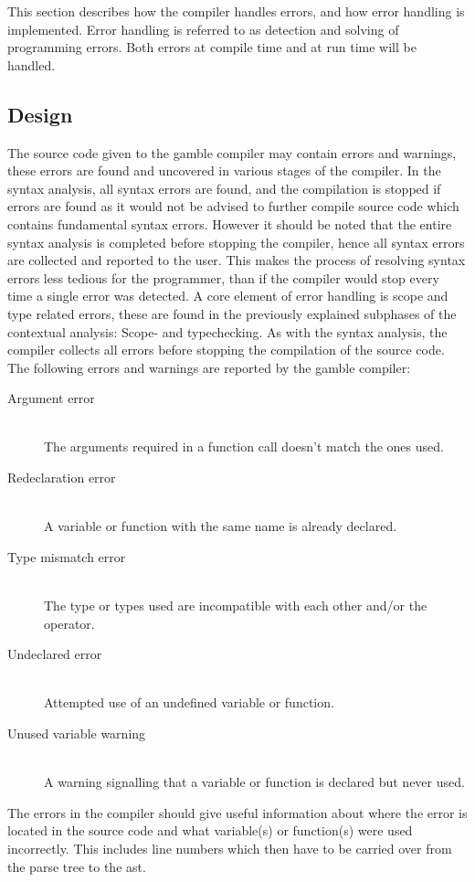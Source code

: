 This section describes how the compiler handles errors, and how error handling is implemented.
Error handling is referred to as detection and solving of programming errors.
Both errors at compile time and at run time will be handled.
\subsection*{Design}\label{subsec:DesignErrorHandling}
The source code given to the \gls{gamble} compiler may contain errors and warnings, these errors are found and uncovered in various stages of the compiler.   
In the syntax analysis, all syntax errors are found, and the compilation is stopped if errors are found as it would not be advised to further compile source code which contains fundamental syntax errors.
However it should be noted that the entire syntax analysis is completed before stopping the compiler, hence all syntax errors are collected and reported to the user.
This makes the process of resolving syntax errors less tedious for the programmer, than if the compiler would stop every time a single error was detected. 
A core element of error handling is scope and type related errors, these are found in the previously explained subphases of the contextual analysis: Scope- and typechecking.
As with the syntax analysis, the compiler collects all errors before stopping the compilation of the source code. 
The following errors and warnings are reported by the \gls{gamble} compiler:
\begin{description}
	\item[Argument error]\hfill\\ 
	The arguments required in a function call doesn't match the ones used.
	\item[Redeclaration error]\hfill\\ 
	A variable or function with the same name is already declared.
	\item[Type mismatch error]\hfill\\ 
	The type or types used are incompatible with each other and/or the operator. 
	\item[Undeclared error]\hfill\\ 
	Attempted use of an undefined variable or function.
	\item[Unused variable warning]\hfill\\ 
	A warning signalling that a variable or function is declared but never used.
\end{description} 
The errors in the compiler should give useful information about where the error is located in the source code and what variable(s) or function(s) were used incorrectly.
This includes line numbers which then have to be carried over from the parse tree to the \acrshort{ast}.

